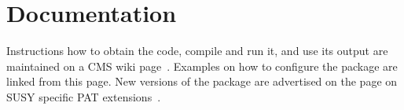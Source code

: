 \documentclass{cmspaper}
\begin{document}
\clearpage


\section{Documentation}
Instructions how to obtain the code, compile and run it, and use its
output are maintained on a CMS wiki page~\cite{twiki}. Examples on how to
configure the package are linked from this page. New versions of the package
are advertised on the page on SUSY specific PAT extensions~\cite{susypat}.

%

\end{document}
